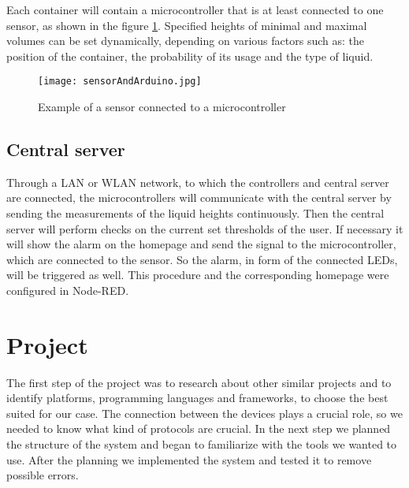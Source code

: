 \documentclass{article}
\begin{document}
Each container will contain a microcontroller that is at least connected to one sensor, as shown in the figure \ref{sensorWithArduino}. Specified heights of minimal and maximal volumes can be set dynamically, depending on various factors such as: the position of the container, the probability of its usage and the type of liquid.

\begin{figure}[]
	\centering
  \texttt{[image: sensorAndArduino.jpg]}
  \caption{Example of a sensor connected to a microcontroller}
  \label{sensorWithArduino}
\end{figure}

\subsection{Central server}

Through a LAN or WLAN network, to which the controllers and central server are
connected, the microcontrollers will communicate with the central server by sending the measurements of the liquid heights continuously. Then the central server will perform checks on the current set thresholds of the user. If necessary it will show the alarm on the homepage and send the signal to the microcontroller, which are connected to the sensor. So the alarm, in form of the connected LEDs, will be triggered as well. This procedure and the corresponding homepage were configured in Node-RED.

\section{Project}

The first step of the project was to research about other similar projects and
to identify platforms, programming languages and frameworks, to choose the best suited for our case. The connection between the devices plays a crucial role, so we needed to know what kind of protocols are crucial. In the next step we planned the structure of the system and began to familiarize with
the tools we wanted to use. After the planning we implemented the system and tested it to remove possible errors.\par
\end{document}
